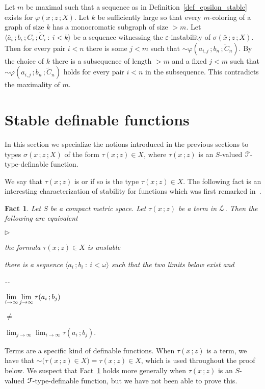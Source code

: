 \documentclass{amsproc}
\makeatletter
\newcommand{\mylabel}[1]{{#1}\hfill}
\renewenvironment{itemize}
  {\begin{list}{$\triangleright$}{%
  \setlength{\parskip}{0mm}
  \setlength{\topsep}{.1\baselineskip}
  \setlength{\rightmargin}{0mm}
  \setlength{\listparindent}{0mm}
  \setlength{\itemindent}{0mm}
  \setlength{\labelwidth}{3ex}
  \setlength{\itemsep}{.1\baselineskip}
  \setlength{\parsep}{.1\baselineskip}
  \setlength{\partopsep}{0mm}
  \setlength{\labelsep}{1ex}
  \setlength{\leftmargin}{\labelwidth+\labelsep}
  \let\makelabel\mylabel}}{%
\end{list}}
\newcounter{thm}
\theoremstyle{mio}
\newtheorem{fact}[thm]{Fact}\tcolorboxenvironment{fact}{mythm}
\providecommand{\proofNameStyle}{\bfseries}
\renewenvironment{proof}[1][\proofname]{\par
  \pushQED{\qed}%
  \normalfont%
  \trivlist
  \item[\hskip\labelsep
        \proofNameStyle
    #1\@addpunct{.}]\ignorespaces
}{%
  \popQED\endtrivlist\@endpefalse
}
\renewcommand*{\emph}[1]{%
   \smash{\tikz[baseline]\node[rectangle, fill=teal!25, rounded corners, inner xsep=0.5ex, inner ysep=0.2ex, anchor=base, minimum height = 2.7ex]{\strut #1};}}
\makeatother
\begin{document}
\begin{proof}
  Let $m$ be maximal such that a sequence as in Definition~\ref{def_epsilon_stable} exists for $\varphi(x\,;z\,;X)$.
  Let $k$ be sufficiently large so that every $m$-coloring of a graph of size $k$ has a monocromatic subgraph of size $>m$.
  Let $\langle \bar a_i\,;b_i\,;C_i\,;\tilde C_i\ :\ i<k\rangle$ be a sequence witnessing the $\varepsilon$-instability of $\sigma(\bar x\,;z\,;X)$.
  Then for every pair $i<n$ there is some $j<m$ such that ${\sim}\varphi(a_{i,j}\,;b_n\,;\tilde C_n)$.
  By the choice of $k$ there is a subsequence of length $>m$ and a fixed $j<m$ such that ${\sim}\varphi(a_{i,j}\,;b_n\,;\tilde C_n)$ holds for every pair $i<n$ in the subsequence. This contradicts the maximality of $m$.
\end{proof}

\section{Stable definable functions}
\def\medrel#1{\parbox{5ex}{\hfil $#1$}}
\def\ceq#1#2#3{\parbox[t]{28ex}{$\displaystyle #1$}\medrel{#2}{$\displaystyle #3$}}

In this section we specialize the notions introduced in the previous sections to types $\sigma(x\,;z\,;X)$ of the form $\tau(x\,;z)\in X$, where $\tau(x\,;z)$ is an $S$-valued ${\EuScript F}$-type-definable function.

We say that $\tau(x\,;z)$ is \emph{stable\/} or \emph{$\varepsilon$-stable\/} if so is the type $\tau(x\,;z)\in X$.
The following fact is an interesting characterization of stability for functions which was first remarked in~\cite{B}.

\begin{fact}\label{fact_grothendieck}
  Let $S$ be a compact metric space.
  Let $\tau(x\,;z)$ be a term in ${\EuScript L}$.
  Then the following are equivalent
  \begin{itemize}
    \item [1.] the formula $\tau(x\,;z)\in X$ is unstable
    \item [2.] there is a sequence $\langle a_i\,;b_i\ :\ i<\omega\rangle$ such that the two limits below exist and\smallskip
    
    \noindent\kern-\kern-
    \ceq{\hfill \lim_{i\to\infty}\lim_{j\to\infty}\tau(a_i\,;b_j)}{\neq}{\lim_{j\to\infty}\lim_{i\to\infty}\tau(a_i\,;b_j).}
  \end{itemize}
\end{fact}  
  Terms are a specific kind of definable functions.
  When $\tau(x\,;z)$ is a term, we have that ${\sim}\big(\tau(x\,;z)\in X\big)=\tau(x\,;z)\in X$, which is used throughout the proof below.
  We suspect that Fact~\ref{fact_grothendieck} holds more generally when $\tau(x\,;z)$ is an $S$-valued ${\EuScript F}$-type-definable function, but we have not been able to prove this.
\end{document}

